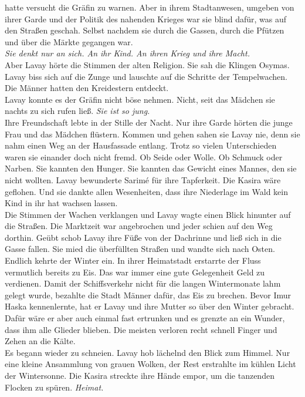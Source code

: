 hatte versucht die Gräfin zu warnen. Aber in ihrem Stadtanwesen, umgeben von ihrer Garde und der 
Politik des nahenden Krieges war sie blind dafür, was auf den Straßen geschah. Selbst nachdem sie 
durch die Gassen, durch die Pfützen und über die Märkte gegangen war.\\
\textit{Sie denkt nur an sich. An ihr Kind. An ihren Krieg und ihre Macht.}\\
Aber Lavay hörte die Stimmen der alten Religion. Sie sah die Klingen Osymas. Lavay biss sich auf die Zunge 
und lauschte auf die Schritte der Tempelwachen. Die Männer hatten den Kreidestern entdeckt.\\
Lavay konnte es der Gräfin nicht böse nehmen. Nicht, seit das Mädchen sie nachts zu sich rufen 
ließ. \textit{Sie ist so jung.}\\
Ihre Freundschaft lebte in der Stille der Nacht. Nur ihre Garde hörten die junge Frau und das 
Mädchen flüstern. Kommen und gehen sahen sie Lavay nie, denn sie nahm einen Weg an der Hausfassade entlang. Trotz 
so vielen Unterschieden waren sie einander doch nicht fremd. Ob Seide oder Wolle. Ob Schmuck oder 
Narben. Sie kannten den Hunger. Sie kannten das Gewicht eines Mannes, den sie nicht wollten. Lavay 
bewunderte Sarimé für ihre Tapferkeit. Die Kasira wäre geflohen. Und sie dankte allen Wesenheiten, dass ihre Niederlage im Wald kein Kind in ihr hat wachsen 
lassen.\\
Die Stimmen der Wachen verklangen und Lavay wagte einen Blick hinunter auf die Straßen. Die 
Marktzeit war angebrochen und jeder schien auf den Weg dorthin. Geübt schob Lavay ihre Füße von der 
Dachrinne und ließ sich in die Gasse fallen. Sie mied die überfüllten Straßen und wandte 
sich nach Osten. Endlich kehrte der Winter ein. In ihrer Heimatstadt erstarrte der Fluss 
vermutlich bereits zu Eis. Das war immer eine gute Gelegenheit Geld zu verdienen. Damit der 
Schiffsverkehr nicht für die langen Wintermonate lahm gelegt wurde, bezahlte die Stadt Männer dafür, 
das Eis zu brechen. Bevor Imur Haska kennenlernte, hat er Lavay und ihre Mutter so über den Winter gebracht. 
Dafür wäre er aber auch 
einmal fast ertrunken und es grenzte an ein Wunder, dass ihm alle Glieder blieben. Die meisten 
verloren recht schnell Finger und Zehen an die Kälte.\\
Es begann wieder zu schneien. Lavay hob lächelnd den Blick zum Himmel. Nur eine kleine Ansammlung von grauen Wolken, 
der Rest erstrahlte im kühlen Licht der Wintersonne.
Die Kasira streckte ihre Hände empor, um die tanzenden Flocken zu spüren. \textit{Heimat.}\\
